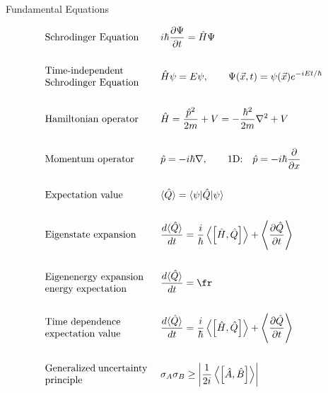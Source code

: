 \documentclass{article}[a4paper]
\begin{document}
%
%
\begin{minipage}[t]{0.5\textwidth}
  \noindent
  \begin{center}
    \large{Fundamental Equations}
  \end{center}
  \noindent
  \begin{align*}
    &\textrm{Schrodinger Equation} & ~&i\hbar \frac{\partial \Psi}{\partial t} = \hat{H} \Psi \\
    &&&\\
    &\textrm{\parbox{0.3\textwidth}{Time-independent \\ Schrodinger Equation}} & ~&\hat{H} \psi = E \psi, \qquad \Psi(\vec{x},t) = \psi(\vec{x}) e^{-iEt/\hbar}\\
    &&&\\
    &\textrm{Hamiltonian operator} & ~&\hat{H} = \frac{\hat{p}^2}{2m} + V = - \frac{\hbar^2}{2m}\nabla^2 + V\\
    &&&\\
    &\textrm{Momentum operator} & ~&\hat{p} = -i\hbar \nabla,\qquad \textrm{1D:}\quad \hat{p} = -i\hbar \frac{\partial }{\partial x}\\
    &&&\\
    &\textrm{\parbox{0.3\textwidth}{Expectation value}} & ~&\langle\hat{Q}\rangle = \langle \psi |\hat{Q}|\psi\rangle\\
    &&&\\
    &\textrm{\parbox{0.3\textwidth}{Eigenstate expansion}} & ~&\frac{d\langle\hat{Q}\rangle}{dt} = \frac{i}{\hbar}\left\langle \left[ \hat{H}, \hat{Q} \right] \right\rangle + \left\langle \frac{\partial \hat{Q}}{\partial t} \right\rangle\\
    &&&\\
    &\textrm{\parbox{0.3\textwidth}{Eigenenergy expansion \\ energy expectation}} & ~&\frac{d\langle\hat{Q}\rangle}{dt} = \fr\\
    &&&\\
    &\textrm{\parbox{0.3\textwidth}{Time dependence \\ expectation value}} & ~&\frac{d\langle\hat{Q}\rangle}{dt} = \frac{i}{\hbar}\left\langle \left[ \hat{H}, \hat{Q} \right] \right\rangle + \left\langle \frac{\partial \hat{Q}}{\partial t} \right\rangle\\
    &&&\\
    &\textrm{\parbox{0.3\textwidth}{Generalized uncertainty \\ principle}} & ~&\sigma_A \sigma_B \geq \left| \frac{1}{2i} \left\langle \left[ \hat{A}, \hat{B} \right] \right\rangle \right|\\

\end{align*}
\end{minipage}
\end{document}
